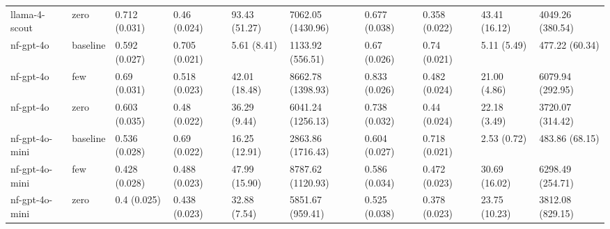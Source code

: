 \begin{table}[htbp]
\begin{tabular}{llllllllll}
llama-4-scout & zero & 0.712 (0.031) & 0.46 (0.024) &  93.43 (51.27) & 7062.05 (1430.96) & 0.677 (0.038) & 0.358 (0.022) &  43.41 (16.12) & 4049.26 (380.54) \\
nf-gpt-4o & baseline & 0.592 (0.027) & 0.705 (0.021) &   5.61 (8.41) & 1133.92 (556.51) & 0.67 (0.026) & 0.74 (0.021) &   5.11 (5.49) & 477.22 (60.34) \\
nf-gpt-4o & few & 0.69 (0.031) & 0.518 (0.023) &  42.01 (18.48) & 8662.78 (1398.93) & 0.833 (0.026) & 0.482 (0.024) &  21.00 (4.86) & 6079.94 (292.95) \\
nf-gpt-4o & zero & 0.603 (0.035) & 0.48 (0.022) &  36.29 (9.44) & 6041.24 (1256.13) & 0.738 (0.032) & 0.44 (0.024) &  22.18 (3.49) & 3720.07 (314.42) \\
nf-gpt-4o-mini & baseline & 0.536 (0.028) & 0.69 (0.022) &  16.25 (12.91) & 2863.86 (1716.43) & 0.604 (0.027) & 0.718 (0.021) &   2.53 (0.72) & 483.86 (68.15) \\
nf-gpt-4o-mini & few & 0.428 (0.028) & 0.488 (0.023) &  47.99 (15.90) & 8787.62 (1120.93) & 0.586 (0.034) & 0.472 (0.023) &  30.69 (16.02) & 6298.49 (254.71) \\
nf-gpt-4o-mini & zero & 0.4 (0.025) & 0.438 (0.023) &  32.88 (7.54) & 5851.67 (959.41) & 0.525 (0.038) & 0.378 (0.023) &  23.75 (10.23) & 3812.08 (829.15) \\
\bottomrule
\end{tabular}
\end{table}

